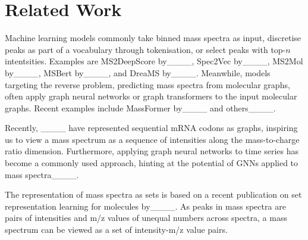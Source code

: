 \section{Related Work}
Machine learning models commonly take binned mass spectra as input, discretise peaks as part of a vocabulary through tokenisation, or select peaks with top-$n$ intentsities. Examples are MS2DeepScore by____, Spec2Vec by____, MS2Mol by____, MSBert by____, and DreaMS by____. Meanwhile, models targeting the reverse problem, predicting mass spectra from molecular graphs, often apply graph neural networks or graph transformers to the input molecular graphs. Recent examples include MassFormer by____ and others____. 

Recently, ____ have represented sequential mRNA codons as graphs, inspiring us to view a mass spectrum as a sequence of intensities along the mass-to-charge ratio dimension. Furthermore, applying graph neural networks to time series has become a commonly used approach, hinting at the potential of GNNs applied to mass spectra____.

The representation of mass spectra as sets is based on a recent publication on set representation learning for molecules by____. As peaks in mass spectra are pairs of intensities and m/z values of unequal numbers across spectra, a mass spectrum can be viewed as a set of intensity-m/z value pairs.